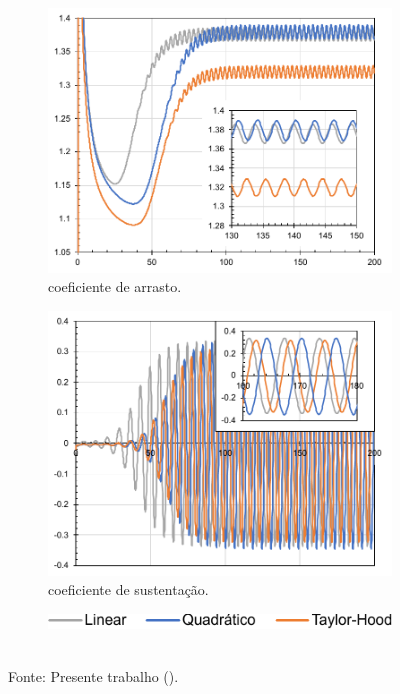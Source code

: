 \begin{figure}[h!]
    \centering
    \caption{Valores ao longo do tempo na simulação LES de:}
    \begin{subfigure}{.49\textwidth}
        \centering
        \includegraphics[width=\linewidth]{Figuras/cylinder/analise2/LES-drag.pdf}
        \caption{coeficiente de arrasto.}
    \end{subfigure}
    \begin{subfigure}{.49\textwidth}
        \centering
        \includegraphics[width=\linewidth]{Figuras/cylinder/analise2/LES-lift.pdf}
        \caption{coeficiente de sustentação.}
    \end{subfigure}
    \begin{subfigure}{\textwidth}
        \centering
        \includegraphics[width=.4\linewidth]{Figuras/cylinder/analise2/legenda.pdf}
    \end{subfigure}
    \\Fonte: Presente trabalho (\the\year).
    \label{fig:cyl-draglift-LES}
\end{figure}

